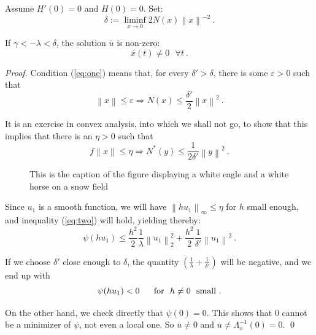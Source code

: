 \documentclass{../styles/svproc}
\begin{document}
%
\begin{proposition}
Assume $H'(0)=0$ and $ H(0)=0$. Set:
\begin{equation}
  \delta := \liminf_{x\to 0} 2 N (x) \left\|x\right\|^{-2}\ .
  \label{eq:one}
\end{equation}

If $\gamma < - \lambda < \delta$,
the solution $\overline{u}$ is non-zero:
\begin{equation}
  \overline{x} (t) \ne 0\ \ \ \forall t\ .
\end{equation}
\end{proposition}
%
\begin{proof}
Condition (\ref{eq:one}) means that, for every
$\delta ' > \delta$, there is some $\varepsilon > 0$ such that
\begin{equation}
  \left\|x\right\| \le \varepsilon \Rightarrow N (x) \le
  \frac{\delta '}{2} \left\|x\right\|^{2}\ .
\end{equation}

It is an exercise in convex analysis, into which we shall not go, to
show that this implies that there is an $\eta > 0$ such that
\begin{equation}
  f\left\|x\right\| \le \eta
  \Rightarrow N^{\ast} (y) \le \frac{1}{2\delta '}
  \left\|y\right\|^{2}\ .
  \label{eq:two}
\end{equation}

\begin{figure}
\vspace{2.5cm}
\caption{This is the caption of the figure displaying a white eagle and
a white horse on a snow field}
\end{figure}

Since $u_{1}$ is a smooth function, we will have
$\left\|hu_{1}\right\|_\infty \le \eta$
for $h$ small enough, and inequality (\ref{eq:two}) will hold,
yielding thereby:
\begin{equation}
  \psi (hu_{1}) \le \frac{h^{2}}{2}
  \frac{1}{\lambda} \left\|u_{1} \right\|_{2}^{2} + \frac{h^{2}}{2}
  \frac{1}{\delta '} \left\|u_{1}\right\|^{2}\ .
\end{equation}

If we choose $\delta '$ close enough to $\delta$, the quantity
$\left(\frac{1}{\lambda} + \frac{1}{\delta '}\right)$
will be negative, and we end up with
\begin{equation}
  \psi (hu_{1}) < 0\ \ \ \ \ {\rm for}\ \ h\ne 0\ \ {\rm small}\ .
\end{equation}

On the other hand, we check directly that $\psi (0) = 0$. This shows
that 0 cannot be a minimizer of $\psi$, not even a local one.
So $\overline{u} \ne 0$ and
$\overline{u} \ne \Lambda_{o}^{-1} (0) = 0$. \qed
\end{proof}
\end{document}
